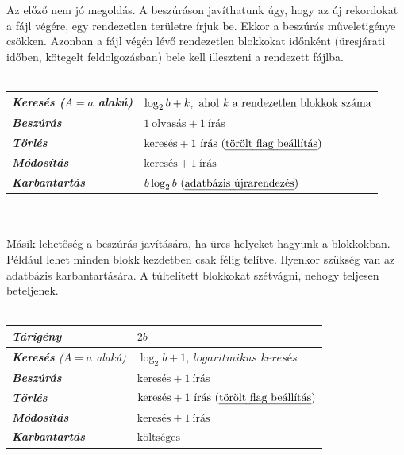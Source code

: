 \documentclass[12pt,margin=0px]{article}
\begin{document}
    \noindent Az előző nem jó megoldás. A beszúráson javíthatunk úgy, hogy az új rekordokat a fájl végére, egy rendezetlen területre írjuk be. Ekkor a beszúrás műveletigénye csökken. Azonban a fájl végén lévő rendezetlen blokkokat időnként (üresjárati időben, kötegelt feldolgozásban) bele kell illeszteni a rendezett fájlba.\\\\
    \renewcommand{\arraystretch}{1.5}
    \begin{tabular}{|l|l|}
       \hline
       \textit{\textbf{Keresés} ($A=a$ alakú)}       & $\log_{2}b + k,\ \text{ahol \textit{k} a rendezetlen blokkok száma}$
       \\ \hline
       \textit{\textbf{Beszúrás}}                  & $1\ \text{olvasás} + 1\ \text{írás}$
       \\ \hline
       \textit{\textbf{Törlés}}                    & $\text{keresés} + 1\ \text{írás (\emph{törölt flag beállítás})}$
       \\ \hline
       \textit{\textbf{Módosítás}}                 & $\text{keresés} + 1\ \text{írás}$
       \\ \hline
       \textit{\textbf{Karbantartás}}              & $b \log_{2}b\ \text{(\emph{adatbázis újrarendezés})}$
       \\ \hline
    \end{tabular}
    \renewcommand{\arraystretch}{1}\\\\

    \noindent Másik lehetőség a beszúrás javítására, ha üres helyeket hagyunk a blokkokban. Például lehet minden blokk kezdetben csak félig telítve. Ilyenkor szükség van az adatbázis karbantartására. A túltelített blokkokat szétvágni, nehogy teljesen beteljenek.\\\\
    \renewcommand{\arraystretch}{1.15}
    \begin{tabular}{|l|l|}
       \hline
       \textit{\textbf{Tárigény}}                  & $2b$
       \\ \hline
       \textit{\textbf{Keresés} ($A=a$ alakú)}     & $\log_{2}b + 1,\ \textit{logaritmikus keresés}$
       \\ \hline
       \textit{\textbf{Beszúrás}}                  & $\text{keresés} + 1\ \text{írás}$
       \\ \hline
       \textit{\textbf{Törlés}}                    & $\text{keresés} + 1\ \text{írás (\emph{törölt flag beállítás})}$
       \\ \hline
       \textit{\textbf{Módosítás}}                 & $\text{keresés} + 1\ \text{írás}$
       \\ \hline
       \textit{\textbf{Karbantartás}}              & $\text{költséges}$
       \\ \hline
    \end{tabular}
    \renewcommand{\arraystretch}{1}
\end{document}
